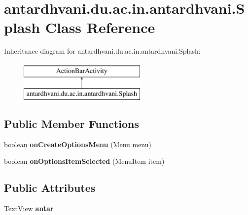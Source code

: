 \hypertarget{classantardhvani_1_1du_1_1ac_1_1in_1_1antardhvani_1_1_splash}{}\section{antardhvani.\+du.\+ac.\+in.\+antardhvani.\+Splash Class Reference}
\label{classantardhvani_1_1du_1_1ac_1_1in_1_1antardhvani_1_1_splash}
Inheritance diagram for antardhvani.\+du.\+ac.\+in.\+antardhvani.\+Splash\+:\begin{figure}[H]
\begin{center}
\leavevmode
\includegraphics[height=2.000000cm]{classantardhvani_1_1du_1_1ac_1_1in_1_1antardhvani_1_1_splash}
\end{center}
\end{figure}
\subsection*{Public Member Functions}
\begin{DoxyCompactItemize}
\item 
\hypertarget{classantardhvani_1_1du_1_1ac_1_1in_1_1antardhvani_1_1_splash_ab1d44322b2d31963c8ff5b169d294c8d}{}boolean {\bfseries on\+Create\+Options\+Menu} (Menu menu)\label{classantardhvani_1_1du_1_1ac_1_1in_1_1antardhvani_1_1_splash_ab1d44322b2d31963c8ff5b169d294c8d}

\item 
\hypertarget{classantardhvani_1_1du_1_1ac_1_1in_1_1antardhvani_1_1_splash_af632c5a62f441c04d8346b20428d4b7a}{}boolean {\bfseries on\+Options\+Item\+Selected} (Menu\+Item item)\label{classantardhvani_1_1du_1_1ac_1_1in_1_1antardhvani_1_1_splash_af632c5a62f441c04d8346b20428d4b7a}

\end{DoxyCompactItemize}
\subsection*{Public Attributes}
\begin{DoxyCompactItemize}
\item 
\hypertarget{classantardhvani_1_1du_1_1ac_1_1in_1_1antardhvani_1_1_splash_a0e03142320c65914aa6e6afd12988e65}{}Text\+View {\bfseries antar}\label{classantardhvani_1_1du_1_1ac_1_1in_1_1antardhvani_1_1_splash_a0e03142320c65914aa6e6afd12988e65}

\end{DoxyCompactItemize}
